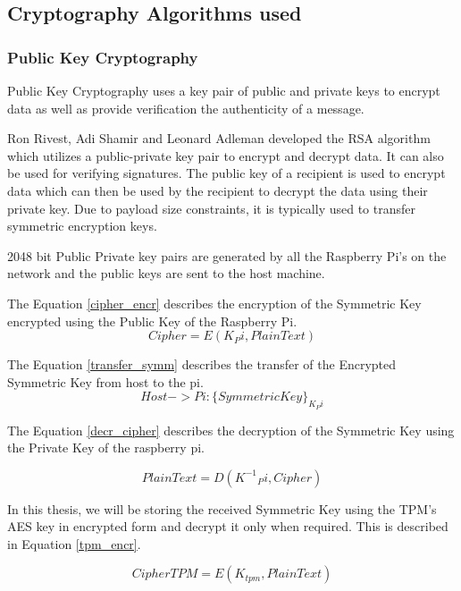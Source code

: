 \documentclass[11pt,openright]{report}
\begin{document}
\subsection{Cryptography Algorithms used}
\subsubsection{Public Key Cryptography}

Public Key Cryptography uses a key pair of public and private keys to encrypt data as well as provide verification the authenticity of a message.

Ron Rivest, Adi Shamir and Leonard Adleman developed the RSA algorithm which utilizes a public-private key pair to encrypt and decrypt data. It can also be used for verifying signatures. The public key of a recipient is used to encrypt data which can then be used by the recipient to decrypt the data using their private key. Due to payload size constraints, it is typically used to transfer symmetric encryption keys.

2048 bit Public Private key pairs are generated by all the Raspberry Pi's on the network and the public keys are sent to the host machine.

The Equation \ref{cipher_encr} describes the encryption of the Symmetric Key encrypted using the Public Key of the Raspberry Pi.
\begin{equation} \label{cipher_encr}
    Cipher = E(K_Pi, PlainText)
\end{equation}

The Equation \ref{transfer_symm} describes the transfer of the Encrypted Symmetric Key from host to the pi.
\begin{equation} \label{transfer_symm}
   Host -> Pi : \{SymmetricKey\}_{K_Pi}
\end{equation}

The Equation \ref{decr_cipher} describes the decryption of the Symmetric Key using the Private Key of the raspberry pi. 

\begin{equation}\label{decr_cipher}
    PlainText = D({K^{-1}}_Pi, Cipher)
\end{equation}

In this thesis, we will be storing the received Symmetric Key using the TPM's AES key in encrypted form and decrypt it only when required. This is described in Equation \ref{tpm_encr}.

\begin{equation}\label{tpm_encr}
    CipherTPM = E(K_{tpm}, PlainText)
\end{equation}
\end{document}
